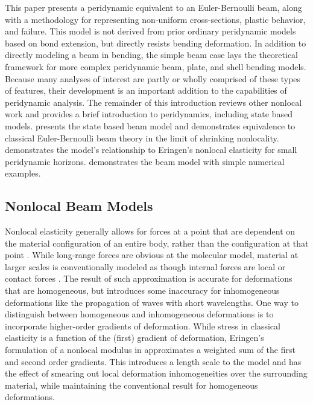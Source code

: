 \documentclass[preprint,review,12pt]{elsarticle}
\begin{document}
This paper presents a peridynamic equivalent to an Euler-Bernoulli beam, along with a methodology for representing non-uniform cross-sections, plastic behavior, and failure.  
This model is not derived from prior ordinary peridynamic models based on bond extension, but directly resists bending deformation.
In addition to directly modeling a beam in bending, the simple beam case lays the theoretical framework for more complex peridynamic beam, plate, and shell bending models.
Because many analyses of interest are partly or wholly comprised of these types of features, their development is an important addition to the capabilities of peridynamic analysis.
%
The remainder of this introduction reviews other nonlocal work and provides a brief introduction to peridynamics, including state based models.
 presents the state based beam model and demonstrates equivalence to classical Euler-Bernoulli beam theory in the limit of shrinking nonlocality.
 demonstrates the model's relationship to Eringen's nonlocal elasticity for small peridynamic horizons.
 demonstrates the beam model with simple numerical examples.
%
\subsection{Nonlocal Beam Models}
\label{sec:NLbeams}
%
Nonlocal elasticity generally allows for forces at a point that are dependent on the material configuration of an entire body, rather than the configuration at that point \cite{eringen1972nonlocal}.  While long-range forces are obvious at the molecular model, material at larger scales is conventionally modeled as though internal forces are local or contact forces \cite{kroner1967elasticity}.
The result of such approximation is accurate for deformations that are homogeneous, but introduces some inaccuracy for inhomogeneous deformations like the propagation of waves with short wavelengths.
One way to distinguish between homogeneous and inhomogeneous deformations is to incorporate higher-order gradients of deformation.
While stress in classical elasticity is a function of the (first) gradient of deformation, Eringen's formulation of a nonlocal modulus in \cite{eringen1983differential} approximates a weighted sum of the first and second order gradients.
This introduces a length scale to the model and has the effect of smearing out local deformation inhomogeneities over the surrounding material, while maintaining the conventional result for homogeneous deformations.
\end{document}
